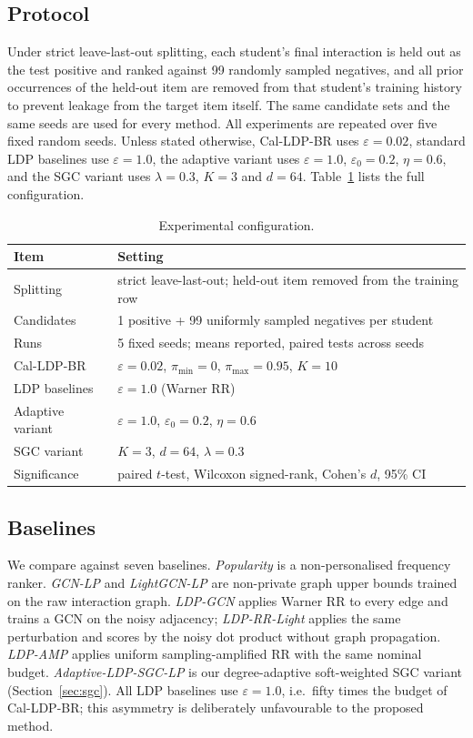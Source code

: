 \documentclass[pdflatex,sn-basic,Numbered]{sn-jnl}
\theoremstyle{plain}
\theoremstyle{remark}
\theoremstyle{definition}
\newcommand{\eps}{\varepsilon}
\begin{document}
\subsection{Protocol}\label{sec:protocol}

Under strict leave-last-out splitting, each student's final interaction is held out as the test positive and ranked against 99 randomly sampled negatives, and all prior occurrences of the held-out item are removed from that student's training history to prevent leakage from the target item itself. The same candidate sets and the same seeds are used for every method. All experiments are repeated over five fixed random seeds. Unless stated otherwise, Cal-LDP-BR uses $\eps=0.02$, standard LDP baselines use $\eps=1.0$, the adaptive variant uses $\eps=1.0$, $\eps_0=0.2$, $\eta=0.6$, and the SGC variant uses $\lambda=0.3$, $K=3$ and $d=64$. Table~\ref{tab:protocol} lists the full configuration.

\begin{table}[t]
\caption{Experimental configuration.}
\label{tab:protocol}
\small
\begin{tabular}{@{}ll@{}}
\toprule
Item & Setting \\
\midrule
Splitting & strict leave-last-out; held-out item removed from the training row \\
Candidates & 1 positive + 99 uniformly sampled negatives per student \\
Runs & 5 fixed seeds; means reported, paired tests across seeds \\
Cal-LDP-BR & $\eps=0.02$, $\pi_{\min}=0$, $\pi_{\max}=0.95$, $K=10$ \\
LDP baselines & $\eps=1.0$ (Warner RR) \\
Adaptive variant & $\eps=1.0$, $\eps_0=0.2$, $\eta=0.6$ \\
SGC variant & $K=3$, $d=64$, $\lambda=0.3$ \\
Significance & paired $t$-test, Wilcoxon signed-rank, Cohen's $d$, 95\% CI \\
\bottomrule
\end{tabular}
\end{table}

\subsection{Baselines}

We compare against seven baselines. \emph{Popularity} is a non-personalised frequency ranker. \emph{GCN-LP} \cite{kipf2017gcn} and \emph{LightGCN-LP} \cite{he2020lightgcn} are non-private graph upper bounds trained on the raw interaction graph. \emph{LDP-GCN} applies Warner RR to every edge and trains a GCN on the noisy adjacency; \emph{LDP-RR-Light} applies the same perturbation and scores by the noisy dot product without graph propagation. \emph{LDP-AMP} applies uniform sampling-amplified RR with the same nominal budget. \emph{Adaptive-LDP-SGC-LP} is our degree-adaptive soft-weighted SGC variant (Section~\ref{sec:sgc}). All LDP baselines use $\eps=1.0$, i.e.\ fifty times the budget of Cal-LDP-BR; this asymmetry is deliberately unfavourable to the proposed method.
\end{document}
